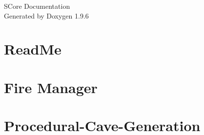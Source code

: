 \documentclass[twoside]{book}
\newcommand{\+}{\discretionary{\mbox{\scriptsize$\hookleftarrow$}}{}{}}
\newcommand{\clearemptydoublepage}{%
    \newpage{\pagestyle{empty}\cleardoublepage}%
  }
\begin{document}
  \raggedbottom
    \hypersetup{pageanchor=false,
                bookmarksnumbered=true,
                pdfencoding=unicode
               }
  \begin{titlepage}
  \vspace*{7cm}
  \begin{center}%
  {\Large SCore Documentation}\\
  \vspace*{1cm}
  {\large Generated by Doxygen 1.9.6}\\
  \end{center}
  \end{titlepage}
  \clearemptydoublepage
  \tableofcontents
  \clearemptydoublepage
  \hypersetup{pageanchor=true}
\chapter{Read\+Me}
\label{md__c___program__files__x86___steam_steamapps_common_7__days__to__die__mods_working_0__s_core__db11aa5f69ee8a9144a244efddbbc0d60}

\chapter{Fire Manager}
\label{md__c___program__files__x86___steam_steamapps_common_7__days__to__die__mods_working_0__s_core__features__fire__readme}

\chapter{Procedural-\/\+Cave-\/\+Generation}
\label{md__c___program__files__x86___steam_steamapps_common_7__days__to__die__mods_working_0__s_core__licenses__cave_generation}

\end{document}
